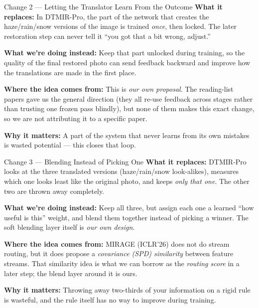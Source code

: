 \documentclass[11pt]{beamer}
\begin{document}
\begin{frame}{Change 2 --- Letting the Translator Learn From the Outcome}
\textbf{What it replaces:} In DTMIR-Pro, the part of the network that creates the
haze/rain/snow versions of the image is trained \emph{once}, then locked. The later
restoration step can never tell it ``you got that a bit wrong, adjust.''

\vspace{3mm}
\textbf{What we're doing instead:} Keep that part unlocked during training, so the
quality of the final restored photo can send feedback backward and improve how the
translations are made in the first place.

\vspace{3mm}
\textbf{Where the idea comes from:} This is \emph{our own proposal}. The reading-list
papers gave us the general direction (they all re-use feedback across stages rather
than trusting one frozen pass blindly), but none of them makes this exact change, so
we are not attributing it to a specific paper.

\vspace{3mm}
\textbf{Why it matters:} A part of the system that never learns from its own
mistakes is wasted potential --- this closes that loop.
\end{frame}

\begin{frame}{Change 3 --- Blending Instead of Picking One}
\textbf{What it replaces:} DTMIR-Pro looks at the three translated versions
(haze/rain/snow look-alikes), measures which one looks least like the original photo,
and keeps \emph{only that one}. The other two are thrown away completely.

\vspace{3mm}
\textbf{What we're doing instead:} Keep all three, but assign each one a
learned ``how useful is this'' weight, and blend them together instead of
picking a winner. The soft blending layer itself is \emph{our own design}.

\vspace{3mm}
\textbf{Where the idea comes from:} MIRAGE (ICLR'26) does not do stream routing,
but it does propose a \emph{covariance (SPD) similarity} between feature streams.
That similarity idea is what we can borrow as the \emph{routing score} in a later
step; the blend layer around it is ours.

\vspace{3mm}
\textbf{Why it matters:} Throwing away two-thirds of your information on a rigid
rule is wasteful, and the rule itself has no way to improve during training.
\end{frame}
\end{document}
